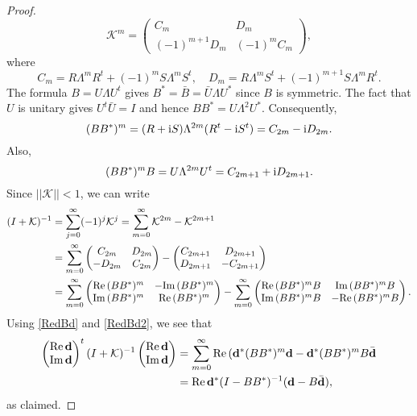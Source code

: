 \documentclass{article}
\numberwithin{equation}{section}
\numberwithin{figure}{section}
\theoremstyle{plain}
\theoremstyle{plain}
\numberwithin{thm}{section}
\theoremstyle{remark}
\newcommand{\re}{\text{{\rm Re}\,}}
\newcommand{\im}{\text{{\rm Im}\,}}
\newcommand{\D}{\mathbb{D}}
\newcommand{\I}{{\rm i}}
\begin{document}
\begin{proof}
\begin{equation*}
    \mathcal{K}^m=\begin{pmatrix}
        C_m & D_m\\(-1)^{m+1}D_m &(-1)^mC_m
    \end{pmatrix},
\end{equation*}
where
\begin{equation*}
    C_m=R\Lambda^mR^t+(-1)^mS\Lambda^mS^t,\quad
    D_m=R\Lambda^mS^t+(-1)^{m+1}S\Lambda^mR^t.
\end{equation*}
The formula $B=U\Lambda U^t$ gives $B^*=\bar{B}=\bar{U}\Lambda U^*$ since $B$ is symmetric. The fact that $U$ is unitary gives $U^t\bar{U}=I$ and hence $BB^*=U\Lambda^2U^*$. Consequently,
\begin{equation*}
    (BB^*)^m=(R+\I S)\Lambda^{2m}(R^t-\I S^t)=C_{2m}-\I D_{2m}.
\end{equation*}
Also,
\begin{equation*}
    (BB^*)^mB=U\Lambda^{2m}U^t=C_{2m+1}+\I D_{2m+1}.
\end{equation*}
Since $||\mathcal{K}||<1$, we can write
\begin{align*}
 (I+\mathcal{K})^{-1}&=\sum_{j=0}^\infty (-1)^j\mathcal{K}^j=\sum_{m=0}^\infty \mathcal{K}^{2m}-\mathcal{K}^{2m+1} \\
 &=\sum_{m=0}^\infty \begin{pmatrix}
        C_{2m} & D_{2m}\\-D_{2m} &C_{2m}
    \end{pmatrix} -\begin{pmatrix}
        C_{2m+1} & D_{2m+1}\\D_{2m+1} &-C_{2m+1}
    \end{pmatrix}\\
  &=\sum_{m=0}^\infty \begin{pmatrix}
      \re(BB^*)^m &-\im(BB^*)^m \\ \im(BB^*)^m &\re(BB^*)^m
  \end{pmatrix}  - \sum_{m=0}^\infty \begin{pmatrix}
      \re(BB^*)^mB &\im(BB^*)^mB \\ \im(BB^*)^mB &-\re(BB^*)^mB
  \end{pmatrix}.
\end{align*}
Using \eqref{RedBd} and \eqref{RedBd2}, we see that 
\begin{align}\label{KtoBid2}
\begin{pmatrix}
     \re {\bf d}\\ \im {\bf d}
 \end{pmatrix} ^t(I+\mathcal{K})^{-1} 
\begin{pmatrix}
     \re {\bf d} \\ \im {\bf d}
 \end{pmatrix}&=\sum_{m=0}^\infty \re({\bf d}^*(BB^*)^m{\bf d}-{\bf d}^*(BB^*)^mB\bar{{\bf d}}\notag\\
&=\re {\bf d}^*(I-BB^*)^{-1}({\bf d}-B\bar{{\bf d}}),
\end{align}
as claimed.
\end{proof}
\end{document}
